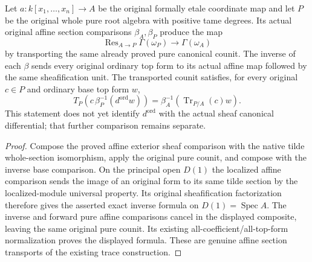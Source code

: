 \begin{lemma}
\label{lem:kn-global-trace-pure-affine-counit}
\leanok
Let $a:k[x_1,\ldots,x_n]\to A$ be the original formally etale coordinate
map and let $P$ be the original whole pure root algebra with positive tame
degrees.  Its actual original affine section comparisons $\beta_A,\beta_P$
produce the map
\[
 \operatorname{Res}_{A\to P}\Gamma(\omega_P)\longrightarrow\Gamma(\omega_A)
\]
by transporting the same already proved pure canonical counit.  The inverse
of each $\beta$ sends every original ordinary top form to its actual affine
map followed by the same sheafification unit.  The transported counit
satisfies, for every original $c\in P$ and ordinary base top form $w$,
\[
 T_P\!\left(c\,\beta_P^{-1}(d^{\mathrm{ord}}w)\right)
       =\beta_A^{-1}\!\left(\operatorname{Tr}_{P/A}(c)w\right).
\]
This statement does not yet identify $d^{\mathrm{ord}}$ with the actual
sheaf canonical differential; that further comparison remains separate.
\end{lemma}
\begin{proof}
Compose the proved affine exterior sheaf comparison with the native tilde
whole-section isomorphism, apply the original pure counit, and compose
with the inverse base comparison.  On the principal open $D(1)$ the
localized affine comparison sends the image of an original form to its
same tilde section by the localized-module universal property.  Its
original sheafification factorization therefore gives the asserted exact
inverse formula on $D(1)=\operatorname{Spec}A$.  The inverse and forward
pure affine comparisons cancel in the displayed composite, leaving the
same original pure counit.  Its existing all-coefficient/all-top-form
normalization proves the displayed formula.  These are genuine affine
section transports of the existing trace construction.
\end{proof}

